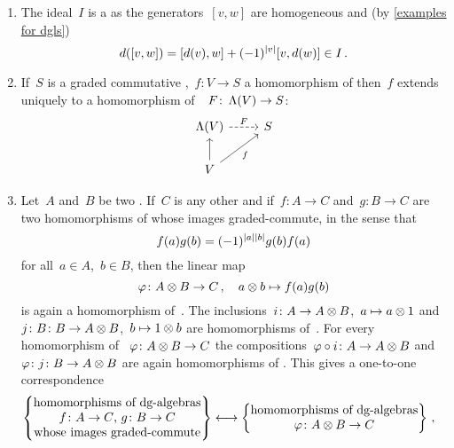 \begin{enumerate}
  \item
    The ideal~$I$ is a {\dgi} as the generators~$[v,w]$ are homogeneous and (by \cref{examples for dgls})
    \[
      d([v,w])
      =
      [d(v), w] + (-1)^{\lvert v\rvert} [v, d(w)]
      \in
      I \,.
    \]
  \item
    If~$S$ is a graded commutative {\dga},~$f \colon V \to S$ a homomorphism of {\dgvs} then~$f$ extends uniquely to a homomorphism of~{\dgas}~$F \colon \operatorname{\Lambda}(V) \to S$:
    \[
      \begin{tikzcd}
        \dgSymm(V)
        \arrow[dashed]{r}[above]{F}
        &
        S
        \\
        V
        \arrow{u}
        \arrow{ur}[below right]{f}
        &
        {}
      \end{tikzcd}
    \]
  \item
    Let~$A$ and~$B$ be two {\dgas}.
    If~$C$ is any other {\dga} and if~$f \colon A \to C$ and~$g \colon B \to C$ are two homomorphisms of {\dgas} whose images graded-commute, in the sense that
    \[
      f(a) g(b)
      =
      (-1)^{\lvert a\rvert \lvert b\rvert} g(b) f(a)
    \]
    for all~$a \in A$,~$b \in B$, then the linear map
    \[
      \varphi
      \colon
      A \otimes B
      \to
      C \,,
      \quad
      a \otimes b
      \mapsto
      f(a) g(b)
    \]
    is again a homomorphism of~{\dgas}.
    The inclusions~$i \colon A \to A \otimes B$,~$a \mapsto a \otimes 1$ and~$j \colon B \colon B \to A \otimes B$,~$b \mapsto 1 \otimes b$ are homomorphisms of~{\dgas}.
    For every homomorphism of {\dgas}~$\varphi \colon A \otimes B \to C$ the compositions~$\varphi \circ i \colon A \to A \otimes B$ and~$\varphi \colon j \colon B \to A \otimes B$ are again homomorphisms of {\dgas}.
    This gives a one-to-one correspondence
    \begin{align*}
      \left\{
        \begin{tabular}{@{}c@{}}
          homomorphisms of {\dgas} \\
          $f \colon A \to C$,~$g \colon B \to C$ \\
          whose images graded-commute
        \end{tabular}
      \right\}
      &\longonetoone
      \left\{
        \begin{tabular}{@{}c@{}}
          homomorphisms of {\dgas} \\
          $\varphi \colon A \tensor B \to C$
        \end{tabular}
      \right\} \,,

\end{align*}
\end{enumerate}
